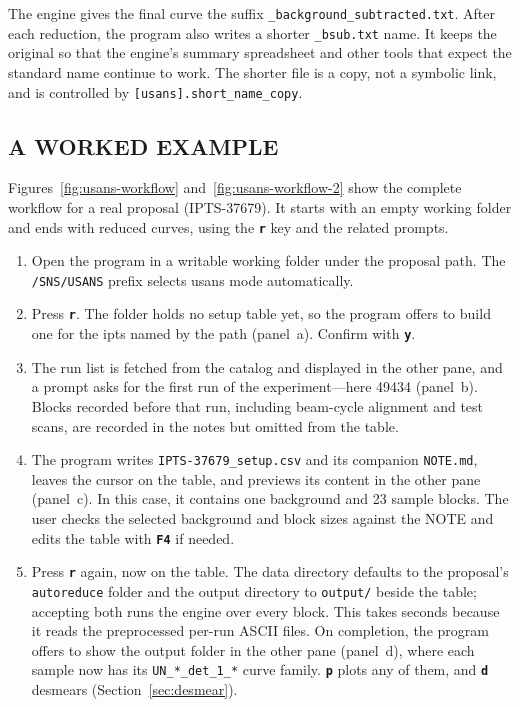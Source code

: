\documentclass[tm]{ornltm}
\newcommand{\key}[1]{\textbf{\texttt{#1}}}
\begin{document}
The engine gives the final curve the suffix
\texttt{\_background\_subtracted.txt}. After each reduction, the program also
writes a shorter \texttt{\_bsub.txt} name. It keeps the original so that the
engine's summary spreadsheet and other tools that expect the standard name
continue to work. The shorter file is a copy, not a symbolic link, and is
controlled by \texttt{[usans].short\_name\_copy}.

\subsection{A WORKED EXAMPLE}
\label{sec:usans-example}

Figures~\ref{fig:usans-workflow} and~\ref{fig:usans-workflow-2} show the complete
workflow for a real proposal (IPTS-37679). It starts with an empty working folder
and ends with reduced curves, using the \key{r} key and the related prompts.

\begin{enumerate}
  \item Open the program in a writable working folder under the proposal path.
    The \texttt{/SNS/USANS} prefix selects \ac{usans} mode automatically.
  \item Press \key{r}. The folder holds no setup table yet, so the program
    offers to build one for the \ac{ipts} named by the path
    (panel~a). Confirm with \key{y}.
  \item The run list is fetched from the catalog and displayed in the other
    pane, and a prompt asks for the first run of the experiment---here
    49434 (panel~b). Blocks recorded before that run, including beam-cycle
    alignment and test scans, are recorded in the notes but omitted from the
    table.
  \item The program writes \texttt{IPTS-37679\_setup.csv} and its companion
    \texttt{NOTE.md}, leaves the cursor on the table, and previews its content
    in the other pane (panel~c). In this case, it contains one background and
    23 sample blocks. The user checks the selected background and block sizes
    against the NOTE and edits the table with \key{F4} if needed.
  \item Press \key{r} again, now on the table. The data directory defaults to
    the proposal's \texttt{autoreduce} folder and the output directory to
    \texttt{output/} beside the table; accepting both runs the engine over
    every block. This takes seconds because it reads the preprocessed per-run
    ASCII files. On completion, the program offers to show the output folder in
    the other pane (panel~d), where each sample now has its
    \texttt{UN\_*\_det\_1\_*} curve family. \key{p} plots any of them, and
    \key{d} desmears (Section~\ref{sec:desmear}).
\end{enumerate}
\end{document}
